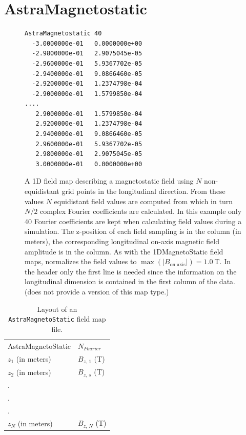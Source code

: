 \section{AstraMagnetostatic}
\label{sec: AstraMagnetostatic}
\begin{figure}[h]
  \begin{fmpage}
\begin{verbatim}
AstraMagnetostatic 40
  -3.0000000e-01   0.0000000e+00
  -2.9800000e-01   2.9075045e-05
  -2.9600000e-01   5.9367702e-05
  -2.9400000e-01   9.0866460e-05
  -2.9200000e-01   1.2374798e-04
  -2.9000000e-01   1.5799850e-04
....
   2.9000000e-01   1.5799850e-04
   2.9200000e-01   1.2374798e-04
   2.9400000e-01   9.0866460e-05
   2.9600000e-01   5.9367702e-05
   2.9800000e-01   2.9075045e-05
   3.0000000e-01   0.0000000e+00
\end{verbatim}
  \end{fmpage}
  \caption[Example of an ASTRA compatible magnetostatic field map]{A 1D field map describing a magnetostatic field using $N$
    non-equidistant grid points in the longitudinal direction. From these values $N$ equidistant field values are computed from
    which in turn $N/2$ complex Fourier coefficients are calculated. In this example only 40 Fourier coefficients are kept
    when calculating field values during a simulation. The z-position of each field sampling is in the 
    column (in meters), the corresponding longitudinal on-axis magnetic field amplitude is in the  column.
    As with the 1DMagnetoStatic  field maps, \opalt normalizes the field values to
    $\max(|B_{\text{on axis}}|) = \SI{1.0}{\tesla}$. In the header only the first line is needed since the information on the
    longitudinal dimension is contained in the first column of the data. (\opalt does not provide a  version of
    this map type.)}
  \label{fig:AstraMagnetoStatic}
\end{figure}

\begin{table}[ht!]
    \caption{Layout of an \texttt{AstraMagnetoStatic} field map file.}
    \label{tab:AstraMagnetoStatic}
    \begin{center}
    \begin{tabular}{ll}
      \hline
      AstraMagnetoStatic & $N_{Fourier}$ \\
      $z_{1}$ (in meters) & $B_{z,\,1}$ (T) \\
      $z_{2}$ (in meters) & $B_{z,\,s}$ (T) \\
      . & \\
      . & \\
      . & \\
      $z_{N}$ (in meters) & $B_{z,\,N}$ (T) \\
      \hline
    \end{tabular}
    \end{center}
\end{table}

